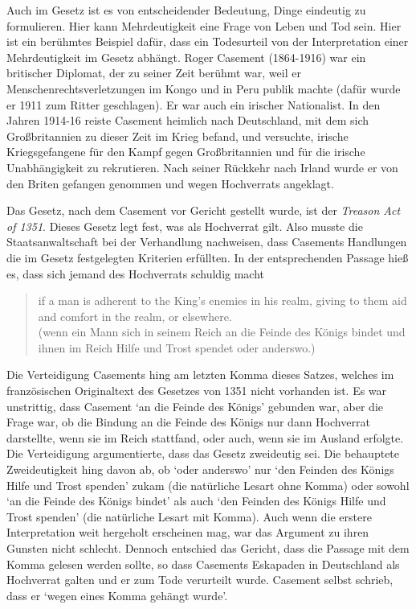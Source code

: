 Auch im Gesetz ist es von entscheidender Bedeutung, Dinge eindeutig zu formulieren. Hier kann Mehrdeutigkeit eine Frage von Leben und Tod sein. Hier ist ein berühmtes Beispiel dafür, dass ein Todesurteil von der Interpretation einer Mehrdeutigkeit im Gesetz abhängt. Roger Casement (1864-1916) war ein britischer Diplomat, der zu seiner Zeit berühmt war, weil er Menschenrechtsverletzungen im Kongo und in Peru publik machte (dafür wurde er 1911 zum Ritter geschlagen). Er war auch ein irischer Nationalist. In den Jahren 1914-16 reiste Casement heimlich nach Deutschland, mit dem sich Gro{\ss}britannien zu dieser Zeit im Krieg befand, und versuchte, irische Kriegsgefangene für den Kampf gegen Gro{\ss}britannien und für die irische Unabhängigkeit zu rekrutieren. Nach seiner Rückkehr nach Irland wurde er von den Briten gefangen genommen und wegen Hochverrats angeklagt.

Das Gesetz, nach dem Casement vor Gericht gestellt wurde, ist der \emph{Treason Act of 1351}. Dieses Gesetz legt fest, was als Hochverrat gilt. Also musste die Staatsanwaltschaft bei der Verhandlung nachweisen, dass Casements Handlungen die im Gesetz festgelegten Kriterien erfüllten. In der entsprechenden Passage hie{\ss} es, dass sich jemand des Hochverrats schuldig macht

\begin{quote}
	if a man is adherent to the King's enemies in his realm, giving to them aid and comfort in the realm, or elsewhere. \\
	(wenn ein Mann sich in seinem Reich an die Feinde des Königs bindet und ihnen im Reich Hilfe und Trost spendet oder anderswo.)
\end{quote}
Die Verteidigung Casements hing am letzten Komma dieses Satzes, welches im französischen Originaltext des Gesetzes von 1351 nicht vorhanden ist. Es war unstrittig, dass Casement `an die Feinde des Königs' gebunden war, aber die Frage war, ob die Bindung an die Feinde des Königs nur dann Hochverrat darstellte, wenn sie im Reich stattfand, oder auch, wenn sie im Ausland erfolgte. Die Verteidigung argumentierte, dass das Gesetz zweideutig sei. Die behauptete Zweideutigkeit hing davon ab, ob `oder anderswo' nur `den Feinden des Königs Hilfe und Trost spenden' zukam (die natürliche Lesart ohne Komma) oder sowohl `an die Feinde des Königs bindet' als auch `den Feinden des Königs Hilfe und Trost spenden' (die natürliche Lesart mit Komma). Auch wenn die erstere Interpretation weit hergeholt erscheinen mag, war das Argument zu ihren Gunsten nicht schlecht. Dennoch entschied das Gericht, dass die Passage mit dem Komma gelesen werden sollte, so dass Casements Eskapaden in Deutschland als Hochverrat galten und er zum Tode verurteilt wurde. Casement selbst schrieb, dass er `wegen eines Komma gehängt wurde'.

